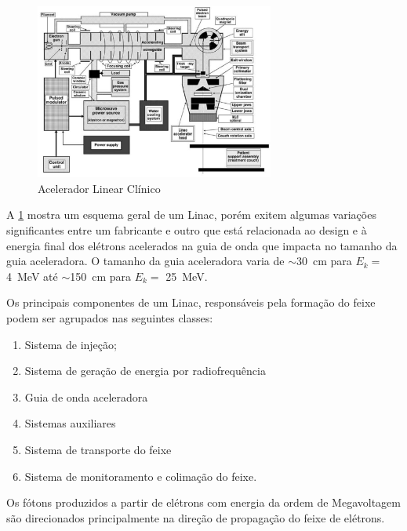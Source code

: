 \documentclass[11pt,a4paper]{article}
\begin{document}
                \begin{figure}[h]
                    \centering
                    \includegraphics[width=0.7\textwidth]{Imagens/esquemaAceleradorLinear.jpg}
                    \caption{Acelerador Linear Clínico}
                    \label{fig:esquemaAceleradorLinear}
                \end{figure}

            
                A \ref{fig:esquemaAceleradorLinear} mostra um esquema geral de um Linac, porém exitem algumas variações significantes entre um fabricante e outro que está relacionada ao design e à energia final dos elétrons acelerados na guia de onda que impacta no tamanho da guia aceleradora. O tamanho da guia aceleradora varia de $\sim $\qty{30}{cm} para $E_k = $ \qty{4}{MeV} até $\sim $\qty{150}{cm} para $E_k = $ \qty{25}{MeV}.

                Os principais componentes de um Linac, responsáveis pela formação do feixe podem ser agrupados nas seguintes classes:

                \begin{enumerate}
                    \item Sistema de injeção;
                    \item Sistema de geração de energia por radiofrequência
                    \item Guia de onda aceleradora
                    \item Sistemas auxiliares
                    \item Sistema de transporte do feixe
                    \item Sistema de monitoramento e colimação do feixe.
                \end{enumerate}
            
            Os fótons produzidos a partir de elétrons com energia da ordem de Megavoltagem são direcionados principalmente na direção de propagação do feixe de elétrons. 
            
\end{document}
